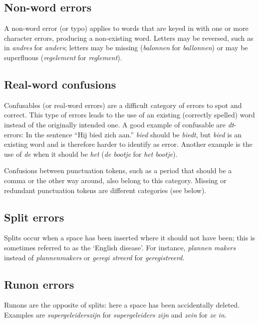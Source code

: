 \documentclass[a4paper,11pt]{article}
\begin{document}
\subsection{Non-word errors}

A non-word error (or typo) applies to words that are keyed in with one
or more character errors, producing a non-existing word. Letters may
be reversed, such as in \emph{andres} for \emph{anders}; letters may
be missing (\emph{balonnen} for \emph{ballonnen}) or may be
superfluous (\emph{regelement} for \emph{reglement}). 

\subsection{Real-word confusions}

Confusables (or real-word errors) are a difficult category of
errors to spot and correct. This type of errors leads to the use of an
existing (correctly spelled) word instead of the originally intended
one. A good example of confusable are \textit{dt}-errors: In the
sentence ``Hij bied zich aan.'' \emph{bied} should be \emph{biedt},
but \emph{bied} is an existing word and is therefore harder to
identify as error.  Another example is the use of \emph{de} when it
should be \emph{het} (\emph{de bootje} for \emph{het bootje}).

Confusions between punctuation tokens, such as a period that should be a
comma or the other way around, also belong to this category. Missing
or redundant punctuation tokens are different categories (see below).

\subsection{Split errors}

Splits occur when a space has been inserted where it should not have
been; this is sometimes referred to as the `English disease'. For
instance, \emph{plannen makers} instead of \emph{plannenmakers} or
\emph{geregi streerd} for \emph{geregistreerd}.

\subsection{Runon errors}

Runons are the opposite of splits: here a space has been accidentally
deleted. Examples are \emph{supergeleiderszijn} for
\emph{supergeleiders zijn} and \emph{zein} for \emph{ze in}.
\end{document}
